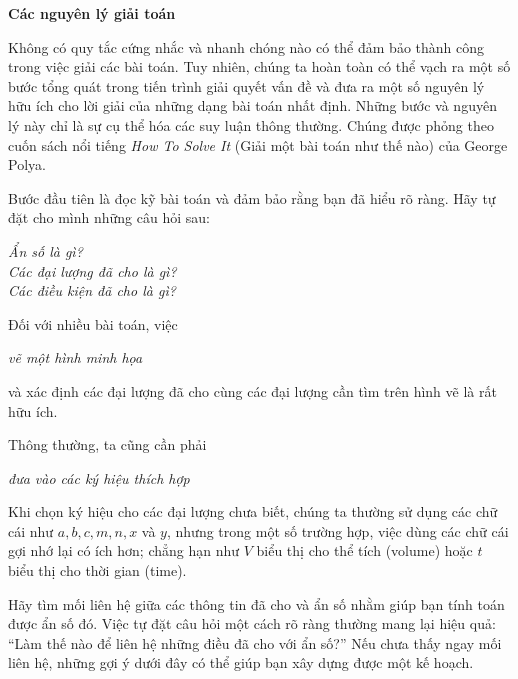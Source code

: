 \documentclass[10pt,letterpaper]{article}
\begin{document}
\begin{minipage}[t]{0.72\textwidth}
    {\fontsize{22}{26}\selectfont\textbf{\textsf{\textcolor{stewartpurple}{Các nguyên lý giải toán}}}}\par
    \vspace{0.4cm}
    Không có quy tắc cứng nhắc và nhanh chóng nào có thể đảm bảo thành công trong việc giải các bài toán. Tuy nhiên, chúng ta hoàn toàn có thể vạch ra một số bước tổng quát trong tiến trình giải quyết vấn đề và đưa ra một số nguyên lý hữu ích cho lời giải của những dạng bài toán nhất định. Những bước và nguyên lý này chỉ là sự cụ thể hóa các suy luận thông thường. Chúng được phỏng theo cuốn sách nổi tiếng \emph{How To Solve It} (Giải một bài toán như thế nào) của George Polya.

    \vspace{0.22cm}
    Bước đầu tiên là đọc kỹ bài toán và đảm bảo rằng bạn đã hiểu rõ ràng. Hãy tự đặt cho mình những câu hỏi sau:
    \begin{center}\vspace{-0.15cm}
        \itshape Ẩn số là gì?\\[0.1cm]
        Các đại lượng đã cho là gì?\\[0.1cm]
        Các điều kiện đã cho là gì?
    \vspace{-0.15cm}\end{center}

    Đối với nhiều bài toán, việc
    \begin{center}\vspace{-0.15cm}
        \itshape vẽ một hình minh họa
    \vspace{-0.15cm}\end{center}
    và xác định các đại lượng đã cho cùng các đại lượng cần tìm trên hình vẽ là rất hữu ích.

    Thông thường, ta cũng cần phải
    \begin{center}\vspace{-0.15cm}
        \itshape đưa vào các ký hiệu thích hợp
    \vspace{-0.15cm}\end{center}

    Khi chọn ký hiệu cho các đại lượng chưa biết, chúng ta thường sử dụng các chữ cái như $a, b, c, m, n, x$ và $y$, nhưng trong một số trường hợp, việc dùng các chữ cái gợi nhớ lại có ích hơn; chẳng hạn như $V$ biểu thị cho thể tích (volume) hoặc $t$ biểu thị cho thời gian (time).

    \vspace{0.25cm}
    Hãy tìm mối liên hệ giữa các thông tin đã cho và ẩn số nhằm giúp bạn tính toán được ẩn số đó. Việc tự đặt câu hỏi một cách rõ ràng thường mang lại hiệu quả: ``Làm thế nào để liên hệ những điều đã cho với ẩn số?'' Nếu chưa thấy ngay mối liên hệ, những gợi ý dưới đây có thể giúp bạn xây dựng được một kế hoạch.


\end{minipage}
\end{document}
